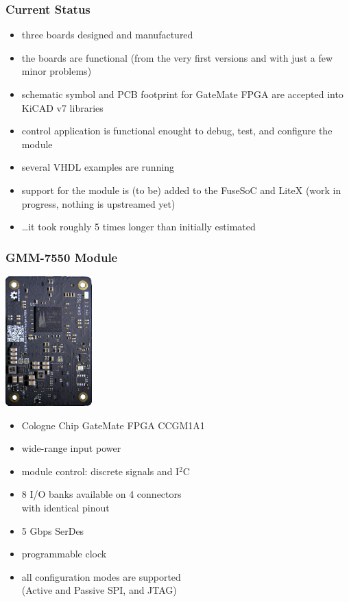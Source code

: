 \begin{frame}
  \frametitle{Current Status}
  \begin{itemize}
    \item three boards designed and manufactured
    \item the boards are functional (from the very first versions and
    with just a few minor problems)
    \item schematic symbol and PCB footprint for GateMate FPGA are accepted
    into KiCAD v7 libraries
    \item control application is functional enought to debug, test,
    and configure the module
    \item several VHDL examples are running
    \item support for the module is (to be) added to the FuseSoC and LiteX
    (work in progress, nothing is upstreamed yet)
    \item \dots it took roughly 5 times longer than initially estimated
  \end{itemize}
\end{frame}

\begin{frame}
  \frametitle{GMM-7550 Module}

  \begin{flushright}
    \includegraphics[height=5cm]{gmm7550.jpg}
  \end{flushright}
  \vspace{-5.5cm}

  \begin{minipage}{7.5cm}
  \begin{itemize}
  \item Cologne Chip GateMate FPGA CCGM1A1
  \item wide-range input power
  \item module control: discrete signals and I$^2$C
  \item 8 I/O banks available on 4 connectors\\with identical pinout
  \item 5 Gbps SerDes
  \item programmable clock
  \item all configuration modes are supported\\(Active and Passive SPI,
  and JTAG)
  \end{itemize}
  \end{minipage}
\end{frame}

